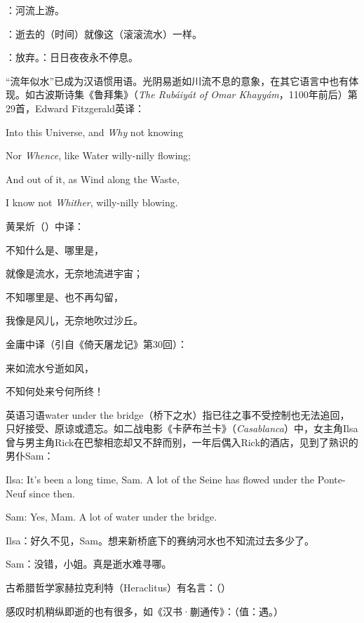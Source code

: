 {
\item {}：河流上游。
\item {}：逝去的（时间）就像这（滚滚流水）一样。
\item {}：放弃。：日日夜夜永不停息。
}
{
“流年似水”已成为汉语惯用语。光阴易逝如川流不息的意象，在其它语言中也有体现。如古波斯诗集《鲁拜集》（\emph{The Rubáiyát of Omar Khayyám}，1100年前后）第29首，Edward Fitzgerald英译：
\begin{lyquotepoeme}
Into this Universe, and \emph{Why} not knowing

Nor \emph{Whence}, like Water willy-nilly flowing;

And out of it, as Wind along the Waste,

I know not \emph{Whither}, willy-nilly blowing.
\end{lyquotepoeme}
黄杲炘（）中译：
\begin{lyquotepoem}
不知什么是、哪里是，

就像是流水，无奈地流进宇宙；

不知哪里是、也不再勾留，

我像是风儿，无奈地吹过沙丘。
\end{lyquotepoem}
金庸中译（引自《倚天屠龙记》第30回）：
\begin{lyquotepoem}
来如流水兮逝如风，

不知何处来兮何所终！
\end{lyquotepoem}

英语习语water under the bridge（桥下之水）指已往之事不受控制也无法追回，只好接受、原谅或遗忘。如二战电影《卡萨布兰卡》（\emph{Casablanca}）中，女主角Ilsa曾与男主角Rick在巴黎相恋却又不辞而别，一年后偶入Rick的酒店，见到了熟识的男仆Sam：

\begin{lyquotepara}
Ilsa: It's been a long time, Sam. A lot of the Seine has flowed under the Ponte-Neuf since then.

Sam: Yes, Mam. A lot of water under the bridge.

Ilsa：好久不见，Sam。想来新桥底下的赛纳河水也不知流过去多少了。

Sam：没错，小姐。真是逝水难寻哪。
\end{lyquotepara}

古希腊哲学家赫拉克利特（Heraclitus）有名言：（）

感叹时机稍纵即逝的也有很多，如《汉书·蒯通传》：（值：遇。）
}


